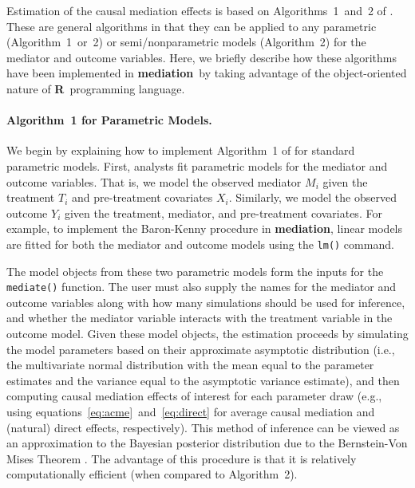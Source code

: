 \documentclass[11pt,letterpaper]{article}
\theoremstyle{plain}
\newcommand\bR{{\bf R}}
\newcommand\bmediation{{\bf mediation}}
\begin{document}
Estimation of the causal mediation effects is based on
Algorithms~1~and~2 of \citet{imai:keel:ting:10}. These are general
algorithms in that they can be applied to any parametric
(Algorithm~1~or~2) or semi/nonparametric models (Algorithm~2) for the
mediator and outcome variables.  Here, we briefly describe how these
algorithms have been implemented in \bmediation\ by taking advantage
of the object-oriented nature of \bR\ programming language.

\paragraph{Algorithm~1 for Parametric Models.}

We begin by explaining how to implement Algorithm~1 of
\citet{imai:keel:ting:10} for standard parametric models.  First,
analysts fit parametric models for the mediator and outcome
variables. That is, we model the observed mediator $M_i$ given the
treatment $T_i$ and pre-treatment covariates $X_i$.  Similarly, we
model the observed outcome $Y_i$ given the treatment, mediator, and
pre-treatment covariates.  For example, to implement the Baron-Kenny
procedure in \bmediation, linear models are fitted for both the
mediator and outcome models using the {\tt lm()} command.

The model objects from these two parametric models form the inputs for
the {\tt mediate()} function.  The user must also supply the names for
the mediator and outcome variables along with how many simulations
should be used for inference, and whether the mediator variable
interacts with the treatment variable in the outcome model.  Given
these model objects, the estimation proceeds by simulating the model
parameters based on their approximate asymptotic distribution (i.e.,
the multivariate normal distribution with the mean equal to the
parameter estimates and the variance equal to the asymptotic variance
estimate), and then computing causal mediation effects of interest for
each parameter draw (e.g., using
equations~\eqref{eq:acme}~and~\eqref{eq:direct} for average causal
mediation and (natural) direct effects, respectively).  This method of
inference can be viewed as an approximation to the Bayesian posterior
distribution due to the Bernstein-Von Mises Theorem
\citep{king:tomz:witt:00}.  The advantage of this procedure is that it
is relatively computationally efficient (when compared to
Algorithm~2).
\end{document}
